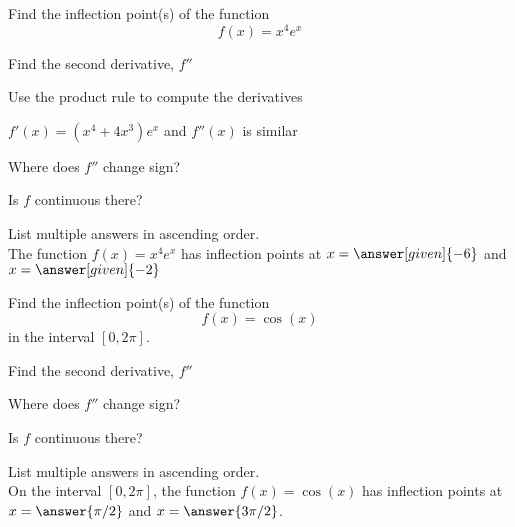 \documentclass{ximera}
\begin{document}
\begin{problem} %
  Find the inflection point(s) of the function
  \[
     f(x) = x^4e^x
  \]
  
    \begin{hint}
      Find the second derivative, $f''$
    \end{hint}
    \begin{hint}
      Use the product rule to compute the derivatives
    \end{hint}
		\begin{hint}
      $f'(x) = (x^4+4x^3)e^x$ and $f''(x)$ is similar
    \end{hint}
		\begin{hint}
      Where does $f''$ change sign?
    \end{hint}
    \begin{hint}
      Is $f$ continuous there?
    \end{hint} 
		List multiple answers in ascending order.\\
		The function $f(x) = x^4e^x$ has inflection points at 
		$x =\answer[given]{-6}$ and $x =\answer[given]{-2}$
		
\end{problem}


\begin{problem} %
  Find the inflection point(s) of the function 
  \[
     f(x) = \cos(x)
  \]
	in the interval $[0, 2\pi].$\\
 
    \begin{hint}
      Find the second derivative, $f''$
    \end{hint}
		\begin{hint}
      Where does $f''$ change sign?
    \end{hint}
    \begin{hint}
      Is $f$ continuous there?
    \end{hint}  
		List multiple answers in ascending order.\\
	On the interval $[0, 2\pi]$, the function $f(x) = \cos(x)$ has inflection points at $x =\answer{\pi/2}$ and $x=\answer{3\pi/2}$.
		
	
\end{problem}
\end{document}
